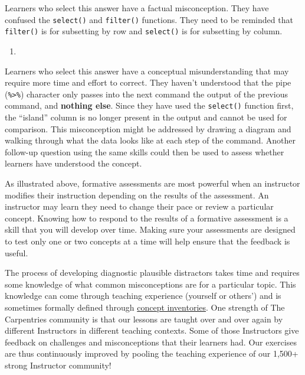 \documentclass[
]{book}
\newenvironment{Shaded}{\begin{snugshade}}{\end{snugshade}}
\newcommand{\DecValTok}[1]{\textcolor[rgb]{0.00,0.00,0.81}{#1}}
\newcommand{\KeywordTok}[1]{\textcolor[rgb]{0.13,0.29,0.53}{\textbf{#1}}}
\newcommand{\NormalTok}[1]{#1}
\newcommand{\OperatorTok}[1]{\textcolor[rgb]{0.81,0.36,0.00}{\textbf{#1}}}
\newcommand{\StringTok}[1]{\textcolor[rgb]{0.31,0.60,0.02}{#1}}
\begin{document}
Learners who select this answer have a factual misconception. They have confused the
\texttt{select()} and \texttt{filter()} functions. They need to be reminded that \texttt{filter()} is for
subsetting by row and \texttt{select()} is for subsetting by column.

\begin{enumerate}
\def\labelenumi{\alph{enumi}.}
\setcounter{enumi}{2}
\item
\end{enumerate}

\begin{Shaded}
\end{Shaded}

Learners who select this answer have a conceptual misunderstanding that may require more
time and effort to correct. They haven't understood that the pipe (\texttt{\%\textgreater{}\%}) character only
passes into the next command the output of the previous command, and \textbf{nothing else}. Since
they have used the \texttt{select()} function first, the ``island'' column is no longer present
in the output and cannot be used for comparison. This misconception might be addressed by
drawing a diagram and walking through what the data looks like at each step of the command.
Another follow-up question using the same skills could then be used to assess whether learners
have understood the concept.

As illustrated above, formative assessments are most powerful when an instructor modifies their
instruction depending on the
results of the assessment. An instructor may learn they need to change their pace or review a
particular concept.
Knowing how to respond to the results of a formative assessment is a skill that you will develop
over time. Making sure your assessments are designed to test only one or two concepts at a time
will help ensure that the feedback is useful.

The process of developing diagnostic plausible distractors takes time and requires some
knowledge of what common
misconceptions are for a particular topic. This knowledge can come through teaching experience
(yourself or others') and is sometimes formally defined through \href{https://en.wikipedia.org/wiki/Concept_inventory}{concept inventories}.
One strength of The Carpentries community is that our lessons are taught over and over again
by different Instructors in different teaching contexts. Some of those Instructors give
feedback on challenges and misconceptions that their learners had. Our exercises are thus
continuously improved by pooling the teaching experience of our 1,500+ strong Instructor
community!
\end{document}
